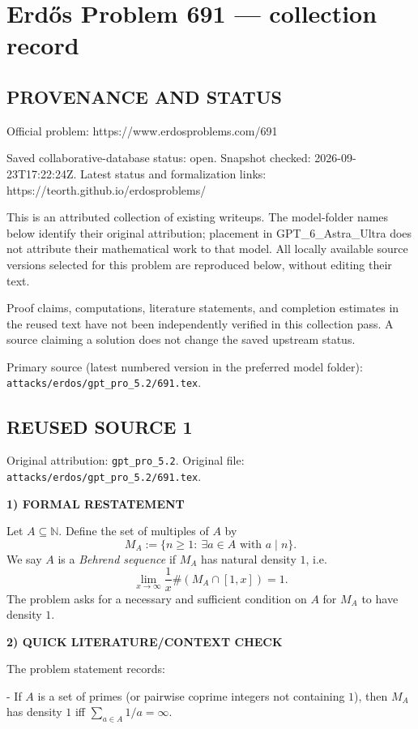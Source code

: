 \section*{Erd\H{o}s Problem 691 --- collection record}

\subsection*{PROVENANCE AND STATUS}
Official problem: https://www.erdosproblems.com/691

Saved collaborative-database status: open.
Snapshot checked: 2026-09-23T17:22:24Z.
Latest status and formalization links: https://teorth.github.io/erdosproblems/

This is an attributed collection of existing writeups. The model-folder names below identify their original attribution; placement in GPT\_6\_Astra\_Ultra does not attribute their mathematical work to that model. All locally available source versions selected for this problem are reproduced below, without editing their text.

Proof claims, computations, literature statements, and completion estimates in the reused text have not been independently verified in this collection pass. A source claiming a solution does not change the saved upstream status.

Primary source (latest numbered version in the preferred model folder): \texttt{attacks/erdos/gpt\_pro\_5.2/691.tex}.

\subsection*{REUSED SOURCE 1}
Original attribution: \texttt{gpt\_pro\_5.2}.
Original file: \texttt{attacks/erdos/gpt\_pro\_5.2/691.tex}.


\noindent\textbf{1) FORMAL RESTATEMENT}

Let $A\subseteq\mathbb{N}$. Define the set of multiples of $A$ by
\[
M_A:=\{n\ge 1:\ \exists a\in A\text{ with }a\mid n\}.
\]
We say $A$ is a \emph{Behrend sequence} if $M_A$ has natural density $1$, i.e.
\[
\lim_{x\to\infty}\frac{1}{x}\#(M_A\cap[1,x])=1.
\]
The problem asks for a necessary and sufficient condition on $A$ for $M_A$ to have density $1$.

\bigskip
\noindent\textbf{2) QUICK LITERATURE/CONTEXT CHECK}

The problem statement records:

- If $A$ is a set of primes (or pairwise coprime integers not containing $1$), then $M_A$ has density $1$ iff $\sum_{a\in A}1/a=\infty$.

